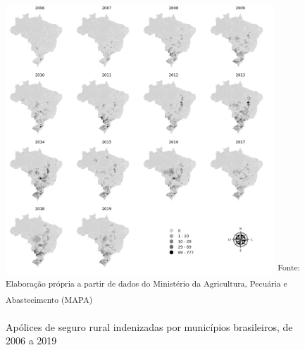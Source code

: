 
\begin{figure}[H]
	\centering
	\caption{Apólices de seguro rural indenizadas por municípios brasileiros, de 2006 a 2019}
	\includegraphics[width=0.9\textwidth]{figuras/map_apolices_indenizadas.png}
	\small \textsuperscript {Fonte: Elaboração própria a partir de dados do Ministério da Agricultura, Pecuária e Abastecimento (MAPA)}
    \label{map_lisa_indenizadas}
\end{figure}


